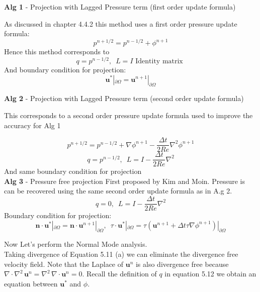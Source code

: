 \textbf{Alg 1} - Projection with Lagged Pressure term (first order update formula)

As discussed in chapter 4.4.2 this method uses a first order pressure update formula:
\begin{equation*}
p^{n+1/2} = p^{n-1/2} + \phi^{n+1}
\end{equation*}
Hence this method corresponds to
\begin{equation*}
q = p^{n-1/2}, \, \, \, L = I \text{   Identity matrix   }
\end{equation*}
And boundary condition for projection:
\begin{equation*}
\textbf{u}^* |_{\partial \Omega} = \textbf{u}^{n+1} |_{\partial \Omega}
\end{equation*}

\textbf{Alg 2} - Projection with Lagged Pressure term (second order update formula)

This corresponds to a second order pressure update formula used to improve the accuracy for Alg 1

\begin{equation*}
p^{n+1/2} = p^{n-1/2} + \nabla \phi^{n+1} - \dfrac{\Delta t}{2 Re} \nabla^2 \phi^{n+1}
\end{equation*}
\begin{equation*}
q = p^{n-1/2}, \, \, \, L = I - \dfrac{\Delta t}{2 Re} \nabla^2
\end{equation*}
And same boundary condition for projection\\

\textbf{Alg 3} - Pressure free projection
First proposed by Kim and Moin. Pressure is can be recovered using the same second order update formula as in A.g 2. \cite{kim1985application,brown2001accurate}
\begin{equation*}
q = 0, \, \, \, L = I - \dfrac{\Delta t}{2 Re} \nabla^2
\end{equation*}
Boundary condition for projection:
\begin{equation*}
\textbf{n} \cdot \textbf{u}^* |_{\partial \Omega} = \textbf{n} \cdot \textbf{u}^{n+1} |_{\partial \Omega}, \, \, \, \textbf{$\tau$} \cdot \textbf{u}^* |_{\partial \Omega} = \textbf{$\tau$} \left(\textbf{u}^{n+1}+ \Delta t \textbf{$\tau$} \nabla \phi^{n+1}\right) |_{\partial \Omega}
\end{equation*}

Now Let's perform the Normal Mode analysis.\\
Taking divergence of Equation 5.11 (a) we can eliminate the divergence free velocity field. Note that the Laplace of $\textbf{u}^n$ is also divergence free because $\nabla \cdot \nabla^2 \,\textbf{u}^n = \nabla^2 \,\nabla \cdot \textbf{u}^n = 0$. Recall the definition of $q$ in equation 5.12 we obtain an equation between $\textbf{u}^*$ and $\phi$.

